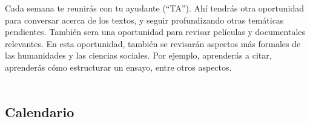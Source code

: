 \documentclass[letterpaper]{article}
\begin{document}
Cada semana te reunir\'as con tu ayudante (``TA''). Ah\'i tendr\'as otra oportunidad para conversar acerca de los textos, y seguir profundizando otras tem\'aticas pendientes. Tambi\'en sera una oportunidad para revisar pel\'iculas y documentales relevantes. En esta oportunidad, tambi\'en se revisar\'an aspectos m\'as formales de las humanidades y las ciencias sociales. Por ejemplo, aprender\'as a citar, aprender\'as c\'omo estructurar un ensayo, entre otros aspectos.
\\
\\

\subsection*{Calendario}

\end{document}
